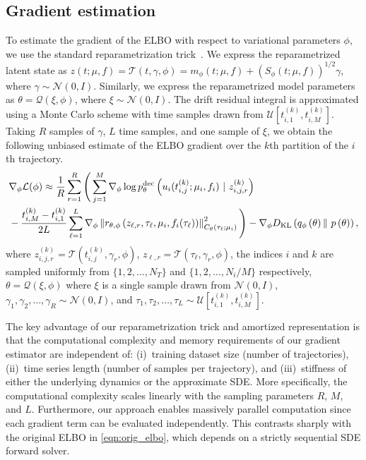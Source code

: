 \documentclass{article}
\begin{document}
	\subsection{Gradient estimation} \label{sec:gradient}
	
	To estimate the gradient of the ELBO with respect to variational parameters $\phi$, we use the standard reparametrization trick~\cite{Kingma_2022_Autoencoding_Variational_Bayes}. We express the reparametrized latent state as $z(t; \mu,f) = \mathcal{T}(t,\gamma,\phi)= m_\phi(t; \mu, f) + (S_\phi(t; \mu, f))^{1/2}\gamma$, where $\gamma \sim \mathcal{N}(0, I)$. Similarly, we express the reparametrized model parameters as $\theta = \mathcal{Q}(\xi, \phi)$, where $\xi \sim \mathcal{N}(0, I)$. The drift residual integral is approximated using a Monte Carlo scheme with time samples drawn from $\mathcal{U}[t_{i,1}^{(k)}, t_{i,M}^{(k)}]$. Taking $R$ samples of $\gamma$, $L$ time samples, and one sample of $\xi$, we obtain the following unbiased estimate of the ELBO gradient over the $k$th partition of the $i$th trajectory.
	\begin{align} \label{eqn:elbo_grad}
		& \nabla_{\phi} \mathcal{L}(\phi) \approx \frac{1}{R}\sum_{r=1}^{R}
		\Bigg( \sum_{j=1}^{M}
		\nabla_{\phi}\log p_{\theta}^{\rm dec} \left ( u_{i}(t_{i,j}^{(k)};  \mu_i, f_i)\ |\ z_{i,j,r}^{(k)}\right ) \nonumber \\
		& - \frac{t_{i,M}^{(k)}-t_{i,1}^{(k)}}{2L} 
		\sum_{\ell=1}^{L}
		\nabla_{\phi}\left\| r_{\theta, \phi} \left(z_{\ell,r}, \tau_\ell, \mu_i, f_i(\tau_{\ell})\right) \right\|_{C_{\theta}(\tau_{\ell};\mu_i)}^2 \Bigg) - \nabla_{\phi} D_{\textrm{KL}}\left(q_\phi\left(\theta \right) \|\ p\left(\theta \right)\right),
	\end{align}
	where $z_{i,j,r}^{(k)} = \mathcal{T}(t_{i,j}^{(k)},\gamma_r,\phi)$, $z_{\ell,r} = \mathcal{T}(\tau_\ell,\gamma_{r},\phi)$, the indices $i$ and $k$ are sampled uniformly from $\{1,2, \dots, N_T\}$ and $\{1,2, \dots, N_i/M\}$ respectively, $\theta = \mathcal{Q}(\xi, \phi)$ where $\xi$ is a single sample drawn from $\mathcal{N}(0, I)$, $\gamma_1, \gamma_2, \dots, \gamma_R \sim \mathcal{N}(0, I)$, and $\tau_1, \tau_2, \dots, \tau_L \sim \mathcal{U}[t_{i,1}^{(k)}, t_{i,M}^{(k)}]$.
		 
	The key advantage of our reparametrization trick and amortized representation is that the computational complexity and memory requirements of our gradient estimator are independent of:  (i)~training dataset size (number of trajectories), (ii)~time series length (number of samples per trajectory), and (iii)~stiffness of either the underlying dynamics or the approximate SDE. 
    More specifically, the computational complexity scales linearly with the sampling parameters $R$, $M$, and $L$. Furthermore, our approach enables massively parallel computation since each gradient term can be evaluated independently. This contrasts sharply with the original ELBO in \eqref{eqn:orig_elbo}, which depends on a strictly sequential SDE forward solver.
	
\end{document}
